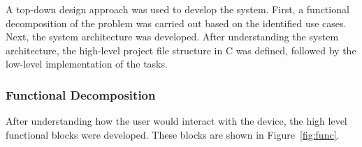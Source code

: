 \documentclass[12pt]{article} %
\begin{document}
    A top-down design approach was used to develop the system. First, a functional
    decomposition of the problem was carried out based on the identified use cases.
    Next, the system architecture was developed. After understanding the system
    architecture, the high-level project file structure in C was defined, followed
    by the low-level implementation of the tasks.

    \subsubsection{Functional Decomposition}


    After understanding how the user would interact with the device, the high level
    functional blocks were developed. These blocks are shown in
    Figure~\ref{fig:func}. 

\end{document}
